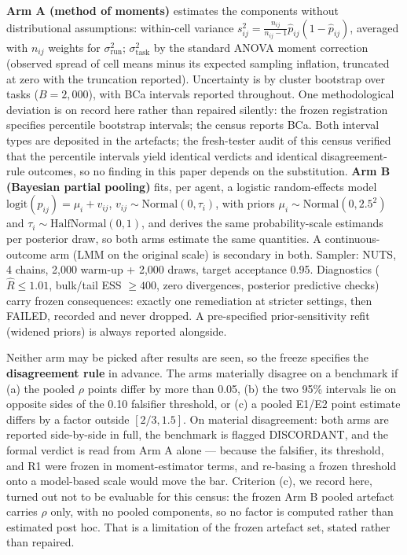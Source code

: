 \documentclass[11pt]{article}
\newcommand{\sT}{\sigma^2_{\mathrm{task}}}
\newcommand{\sR}{\sigma^2_{\mathrm{run}}}
\begin{document}
\textbf{Arm A (method of moments)} estimates the components without
distributional assumptions: within-cell variance
$s^2_{ij} = \frac{n_{ij}}{n_{ij}-1}\hat{p}_{ij}(1-\hat{p}_{ij})$,
averaged with $n_{ij}$ weights for $\sR$; $\sT$ by the standard ANOVA
moment correction (observed spread of cell means minus its expected
sampling inflation, truncated at zero with the truncation reported).
Uncertainty is by cluster bootstrap over tasks ($B = 2{,}000$), with
BCa intervals reported throughout. One methodological deviation is on
record here rather than repaired silently: the frozen registration
specifies percentile bootstrap intervals; the census reports BCa. Both
interval types are deposited in the artefacts; the fresh-tester audit
of this census verified that the percentile intervals yield identical
verdicts and identical disagreement-rule outcomes, so no finding in
this paper depends on the substitution. \textbf{Arm B (Bayesian partial pooling)} fits, per
agent, a logistic random-effects model
$\mathrm{logit}(p_{ij}) = \mu_i + v_{ij}$, $v_{ij} \sim
\mathrm{Normal}(0, \tau_i)$, with priors $\mu_i \sim \mathrm{Normal}(0,
2.5^2)$ and $\tau_i \sim \mathrm{HalfNormal}(0,1)$, and derives the
same probability-scale estimands per posterior draw, so both arms
estimate the same quantities. A continuous-outcome arm (LMM on the
original scale) is secondary in both. Sampler: NUTS, 4 chains, 2,000
warm-up + 2,000 draws, target acceptance 0.95. Diagnostics
($\hat{R} \leq 1.01$, bulk/tail ESS $\geq 400$, zero divergences,
posterior predictive checks) carry frozen consequences: exactly one
remediation at stricter settings, then FAILED, recorded and never
dropped. A pre-specified prior-sensitivity refit (widened priors) is
always reported alongside.

Neither arm may be picked after results are seen, so the freeze
specifies the \textbf{disagreement rule} in advance. The arms
materially disagree on a benchmark if (a) the pooled $\rho$ points
differ by more than 0.05, (b) the two 95\% intervals lie on opposite
sides of the 0.10 falsifier threshold, or (c) a pooled E1/E2 point
estimate differs by a factor outside $[2/3, 1.5]$. On material
disagreement: both arms are reported side-by-side in full, the
benchmark is flagged DISCORDANT, and the formal verdict is read from
Arm A alone --- because the falsifier, its threshold, and R1 were
frozen in moment-estimator terms, and re-basing a frozen threshold
onto a model-based scale would move the bar. Criterion (c), we record
here, turned out not to be evaluable for this census: the frozen Arm B
pooled artefact carries $\rho$ only, with no pooled components, so no
factor is computed rather than estimated post hoc. That is a
limitation of the frozen artefact set, stated rather than repaired.
\end{document}
